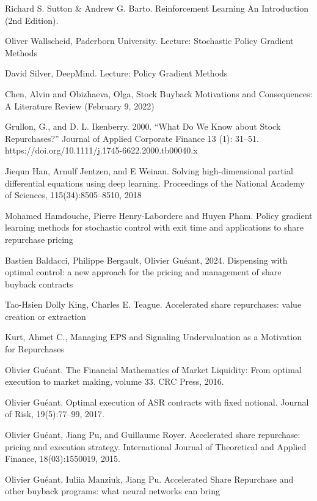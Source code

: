 \documentclass[a4paper, 12pt]{article}
\begin{document}
\begin{thebibliography}{9}

Richard S. Sutton \& Andrew G. Barto. Reinforcement Learning An Introduction (2nd Edition).

Oliver Wallscheid, Paderborn University. Lecture: Stochastic Policy Gradient Methods

David Silver, DeepMind. Lecture: Policy Gradient Methods

Chen, Alvin and Obizhaeva, Olga, Stock Buyback Motivations and Consequences: A Literature Review (February 9, 2022)

Grullon, G., and D. L. Ikenberry. 2000. “What Do We Know about Stock
Repurchases?” Journal of Applied Corporate Finance 13 (1): 31–51. https://doi.org/10.1111/j.1745-6622.2000.tb00040.x

Jiequn Han, Arnulf Jentzen, and E Weinan. Solving high-dimensional partial differential equations using deep learning. Proceedings of the National Academy of Sciences,
115(34):8505–8510, 2018

Mohamed Hamdouche, Pierre Henry-Labordere and Huyen Pham. Policy gradient learning methods for stochastic control with exit time and applications to share repurchase pricing 

Bastien Baldacci, Philippe Bergault, Olivier Guéant, 2024. Dispensing with optimal control: a new approach for the pricing and management of share buyback contracts

Tao-Hsien Dolly King, Charles E. Teague. Accelerated share repurchases: value creation or extraction

Kurt, Ahmet C., Managing EPS and Signaling Undervaluation as a Motivation for Repurchases

Olivier Guéant. The Financial Mathematics of Market Liquidity: From optimal execution
to market making, volume 33. CRC Press, 2016.

Olivier Guéant. Optimal execution of ASR contracts with fixed notional. Journal of
Risk, 19(5):77–99, 2017.

Olivier Guéant, Jiang Pu, and Guillaume Royer. Accelerated share repurchase: pricing and execution strategy. International Journal of Theoretical and Applied Finance,
18(03):1550019, 2015.

Olivier Guéant, Iuliia Manziuk, Jiang Pu. Accelerated Share Repurchase and other buyback programs: what neural networks can bring



\end{thebibliography}
\end{document}
